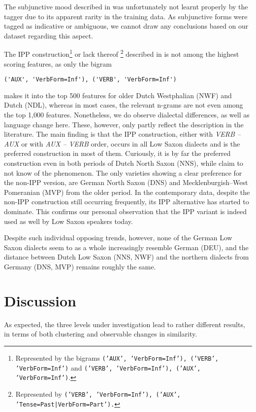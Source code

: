 \documentclass[output=paper,colorlinks,citecolor=brown]{langscibook}
\begin{document}
The subjunctive mood described in  was unfortunately not learnt properly by the tagger due to its apparent rarity in the training data. As subjunctive forms were tagged as indicative or ambiguous, we cannot draw any conclusions based on our dataset regarding this aspect. 

The IPP construction\footnote{Represented by the bigrams \texttt{('AUX', 'VerbForm=Inf'), ('VERB', 'VerbForm=Inf')} and \texttt{('VERB', 'VerbForm=Inf'), ('AUX', 'VerbForm=Inf')}.} or lack thereof \footnote{Represented by \texttt{('VERB', 'VerbForm=Inf'), ('AUX', 'Tense=Past|VerbForm=Part').}} described in  is not among the highest scoring features, as only the bigram
\begin{lstlisting}
('AUX', 'VerbForm=Inf'), ('VERB', 'VerbForm=Inf')
\end{lstlisting}
makes it into the top 500 features for older Dutch Westphalian (NWF) and Dutch (NDL), whereas in most cases, the relevant n-grams are not even among the top 1,000 features. Nonetheless, we do observe dialectal differences, as well as language change here. These, however, only partly reflect the description in the literature. The main finding is that the IPP construction, either with \textit{VERB -- AUX} or with \textit{AUX -- VERB} order, occurs in all Low Saxon dialects and is the preferred construction in most of them. Curiously, it is by far the preferred construction even in both periods of Dutch North Saxon (NNS), while \citet{BloemhoffEtAl2019} claim to not know of the phenomenon. The only varieties showing a clear preference for the non-IPP version, are German North Saxon (DNS) and Mecklenburgish--West Pomeranian (MVP) from the older period.
In the contemporary data, despite the non-IPP construction still occurring frequently, its IPP alternative has started to dominate. This confirms our personal observation that the IPP variant is indeed used as well by Low Saxon speakers today. 

Despite such individual opposing trends, however, none of the German Low Saxon dialects seem to as a whole increasingly resemble German (DEU), and the distance between Dutch Low Saxon (NNS, NWF) and the northern dialects from Germany (DNS, MVP) remains roughly the same. 

\section{Discussion}\label{discussion}

As expected, the three levels under investigation lead to rather different results, in terms of both clustering and observable changes in similarity.  
\end{document}
